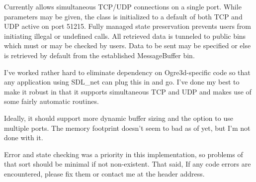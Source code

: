 Currently allows simultaneous T\-C\-P/\-U\-D\-P connections on a single port. While parameters may be given, the class is initialized to a default of both T\-C\-P and U\-D\-P active on port 51215. Fully managed state preservation prevents users from initiating illegal or undefined calls. All retrieved data is tunneled to public bins which must or may be checked by users. Data to be sent may be specified or else is retrieved by default from the established Message\-Buffer bin.

I've worked rather hard to eliminate dependency on Ogre3d-\/specific code so that any application using S\-D\-L\-\_\-net can plug this in and go. I've done my best to make it robust in that it supports simultaneous T\-C\-P and U\-D\-P and makes use of some fairly automatic routines.

Ideally, it should support more dynamic buffer sizing and the option to use multiple ports. The memory footprint doesn't seem to bad as of yet, but I'm not done with it.

Error and state checking was a priority in this implementation, so problems of that sort should be minimal if not non-\/existent. That said, If any code errors are encountered, please fix them or contact me at the header address. 

